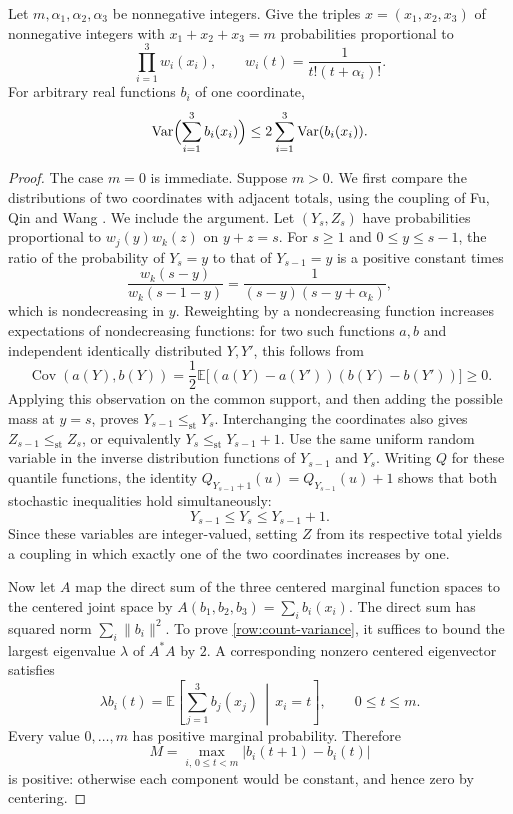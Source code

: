 \begin{lemma}\label{row:counts}
Let $m,\alpha_1,\alpha_2,\alpha_3$ be nonnegative integers.  Give the
triples $x=(x_1,x_2,x_3)$ of nonnegative integers with
$x_1+x_2+x_3=m$ probabilities proportional to
\[
 \prod_{i=1}^3 w_i(x_i),\qquad
 w_i(t)=\frac1{t!(t+\alpha_i)!}.
\]
For arbitrary real functions $b_i$ of one coordinate,
\begin{equation}\label{row:count-variance}
 \operatorname{Var}\Bigl(\sum_{i=1}^3b_i(x_i)\Bigr)
 \le 2\sum_{i=1}^3\operatorname{Var}(b_i(x_i)).
\end{equation}
\end{lemma}
\begin{proof}
The case $m=0$ is immediate.  Suppose $m>0$.
We first compare the distributions of two coordinates with adjacent
totals, using the coupling of Fu, Qin and Wang \cite[Lemma~5.2]{FQW26}.
We include the argument.  Let $(Y_s,Z_s)$ have probabilities proportional to
$w_j(y)w_k(z)$ on $y+z=s$.  For $s\ge1$ and $0\le y\le s-1$, the
ratio of the probability of $Y_s=y$ to that of $Y_{s-1}=y$ is a positive
constant times
\[
 \frac{w_k(s-y)}{w_k(s-1-y)}
 =\frac1{(s-y)(s-y+\alpha_k)},
\]
which is nondecreasing in $y$.  Reweighting by a nondecreasing function
increases expectations of nondecreasing functions: for two such
functions $a,b$ and independent identically distributed $Y,Y'$, this
follows from
\[
 \operatorname{Cov}(a(Y),b(Y))
 =\frac12\mathbb E\bigl[(a(Y)-a(Y'))(b(Y)-b(Y'))\bigr]\ge0.
\]
Applying this observation on the common support, and then adding the
possible mass at $y=s$, proves $Y_{s-1}\le_{\mathrm{st}}Y_s$.
Interchanging the coordinates also gives
$Z_{s-1}\le_{\mathrm{st}}Z_s$, or equivalently
$Y_s\le_{\mathrm{st}}Y_{s-1}+1$.
Use the same uniform random variable in the inverse distribution
functions of $Y_{s-1}$ and $Y_s$.  Writing $Q$ for these quantile
functions, the identity $Q_{Y_{s-1}+1}(u)=Q_{Y_{s-1}}(u)+1$ shows that
both stochastic inequalities hold simultaneously:
\begin{equation}\label{row:covering-coupling}
 Y_{s-1}\le Y_s\le Y_{s-1}+1.
\end{equation}
Since these variables are integer-valued, setting $Z$ from its
respective total yields a coupling in which exactly one of the two
coordinates increases by one.

Now let $A$ map the direct sum of the three centered marginal function
spaces to the centered joint space by
$A(b_1,b_2,b_3)=\sum_i b_i(x_i)$.
The direct sum has squared norm $\sum_i\|b_i\|^2$.
To prove \eqref{row:count-variance}, it suffices to bound the largest
eigenvalue $\lambda$ of $A^*A$ by $2$.  A corresponding nonzero
centered eigenvector satisfies
\begin{equation}\label{row:count-eigenvector}
 \lambda b_i(t)
 =\mathbb E\left[\sum_{j=1}^3b_j(x_j)\,\middle|\,x_i=t\right],
 \qquad 0\le t\le m.
\end{equation}
Every value $0,\ldots,m$ has positive marginal probability.  Therefore
\[
 M=\max_{i,\,0\le t<m}|b_i(t+1)-b_i(t)|
\]
is positive: otherwise each component would be constant, and hence
zero by centering.


\end{proof}
